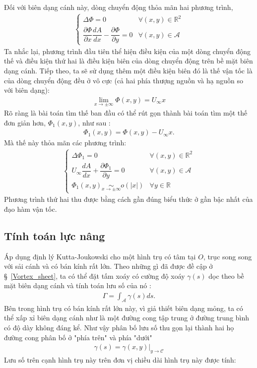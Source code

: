 \documentclass[KHI_DONG_HOC.tex]{subfiles}
\begin{document}
	Đối với biên dạng cánh này, dòng chuyển động thỏa mãn hai phương trình,
	\begin{align}
		\begin{cases}
			\Delta\Phi=0&\forall(x,y)\in\mathbb R^2\\
			\dfrac{\partial\Phi}{\partial x}\dfrac{dA}{dx}-\dfrac{\partial\Phi}{\partial y} = 0&\forall(x,y)\in\mathcal A
		\end{cases}
	\end{align}
	Ta nhắc lại, phương trình đầu tiên thể hiện điều kiện của một dòng chuyển động thế và điều kiện thứ hai là điều kiện biên của dòng chuyển động trên bề mặt biên dạng cánh. Tiếp theo, ta sẽ sử dụng thêm một điều kiện biên đó là thế vận tốc là của dòng chuyển động đều ở vô cực (cả hai phía thượng nguồn và hạ nguồn so với biên dạng):
	\begin{align}
		\mathop {\lim }\limits_{x \to  \pm \infty } \Phi \left( {x,y} \right) = {U_\infty }x
	\end{align}
	Rõ ràng là bài toán tìm thế ban đầu có thể rút gọn thành bài toán tìm một thế đơn giản hơn, $\Phi_1(x,y)$, như sau :
	\begin{align}
		\Phi_1(x,y) = \Phi(x,y) -  {U_\infty }x.
	\end{align}
	Mà thế này thỏa mãn các phương trình:
	\begin{align}
		\begin{cases}
			\Delta\Phi_1=0&\forall(x,y)\in\mathbb R^2\\
			U_\infty\dfrac{dA}{dx}+\dfrac{\partial\Phi_1}{\partial y} = 0&\forall(x,y)\in\mathcal A\\
			{\Phi _1}\left( {x,y} \right)\mathop  \sim \limits_{x \to  \pm \infty } o\left( {\left| x \right|} \right)&\forall  y\in\mathbb R
		\end{cases}
	\end{align}
	Phương trình thứ hai thu được bằng cách gần đúng biểu thức ở gần bậc nhất của đạo hàm vận tốc.
	
	\subsection{Tính toán lực nâng}
	
	Áp dụng định lý Kutta-Joukowski cho một hình trụ có tâm tại $O$, trục song song với sải cánh và có bán kính rất lớn. Theo những gì đã được đề cập ở \S\ \ref{Vortex_sheet}, ta có thể đặt tấm xoáy có cường độ xoáy $\gamma(s)$ dọc theo bề mặt biên dạng cánh và tính toán lưu số của nó :
	\begin{align}
		\Gamma=\int_\mathcal{A}\gamma(s)ds.
	\end{align}
	Bên trong hình trụ có bán kính rất lớn này, vì giả thiết biên dạng mỏng, ta có thể xấp xỉ biên dạng cánh như là một đường cong tập trung ở đường trung bình có độ dày không đáng kể. Như vậy phân bố lưu số thu gọn lại thành hai họ đường cong phân bố ở "phía trên" và phía "dưới"
	\begin{align}
		\gamma(s)=\gamma(x,y)|_{y\rightarrow \mathcal C}
	\end{align}
	Lưu số trên cạnh hình trụ này trên đơn vị chiều dài hình trụ này được tính:
	
\end{document}
